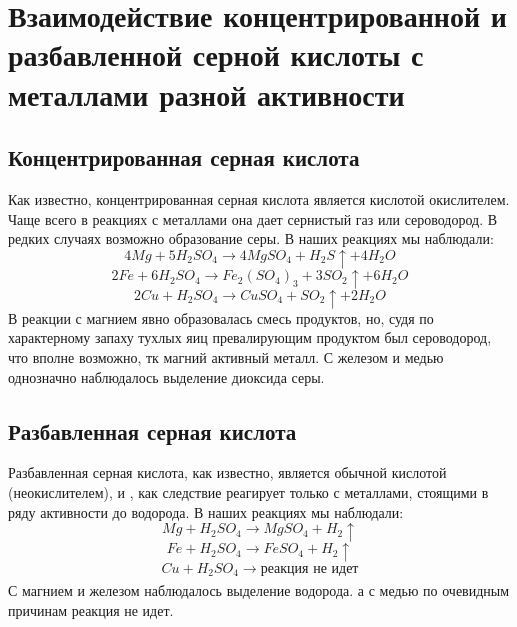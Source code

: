 \documentclass[a4paper, 12pt]{article}
\begin{document}
\section{Взаимодействие концентрированной и разбавленной серной кислоты с металлами разной активности}
\subsection{Концентрированная серная кислота}
Как известно, концентрированная серная кислота является кислотой окислителем. Чаще всего в реакциях с металлами она дает сернистый газ или сероводород. В редких случаях возможно образование серы. В наших реакциях мы наблюдали:
\begin{equation}
    4Mg + 5H_2SO_4 \xrightarrow[]{} 4MgSO_4 + H_2S\uparrow + 4H_2O
\end{equation}
\begin{equation}
    2Fe + 6H_2SO_4 \xrightarrow[]{} Fe_2(SO_4)_3 + 3SO_2 \uparrow+ 6H_2O
\end{equation}
    \begin{equation}
        2Cu + H_2SO_4 \xrightarrow[]{} CuSO_4 + SO_2 \uparrow + 2H_2O
    \end{equation}
В реакции с магнием явно образовалась смесь продуктов, но, судя по характерному запаху тухлых яиц превалирующим продуктом был сероводород, что вполне возможно, тк магний активный металл. С железом и медью однозначно наблюдалось выделение диоксида серы.
\subsection{Разбавленная серная кислота}
Разбавленная серная кислота, как известно, является обычной кислотой (неокислителем), и , как следствие реагирует только с металлами, стоящими в ряду активности до водорода. В наших реакциях мы наблюдали:
\begin{equation}
    Mg + H_2SO_4 \xrightarrow[]{} MgSO_4 + H_2 \uparrow
\end{equation}
\begin{equation}
    Fe + H_2SO_4 \xrightarrow[]{} FeSO_4 + H_2 \uparrow
\end{equation}
\begin{equation}
    Cu + H_2SO_4 \xrightarrow[]{} \text{реакция не идет}
\end{equation}
С магнием и железом наблюдалось выделение водорода. а с медью по очевидным причинам реакция не идет.
\end{document}
